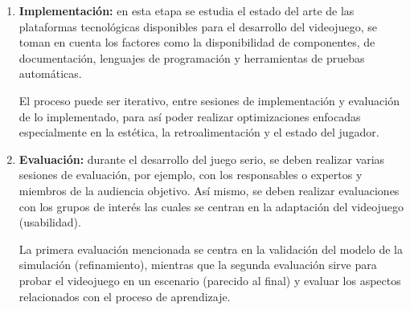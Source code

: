 \begin{enumerate}
\item \textbf{Implementación:} en esta etapa se estudia el estado del arte de las
    plataformas tecnológicas disponibles para el desarrollo del videojuego, se toman
    en cuenta los factores como la disponibilidad de componentes, de
    documentación, lenguajes de programación y herramientas de pruebas
    automáticas.

El proceso puede ser iterativo, entre sesiones de implementación y evaluación de
lo implementado, para así poder realizar optimizaciones enfocadas especialmente
en la estética, la retroalimentación y el estado del jugador.

\item \textbf{Evaluación:} durante el desarrollo del juego serio, se deben
    realizar varias sesiones de evaluación, por ejemplo, con los responsables o
    expertos y miembros de la audiencia objetivo. Así mismo, se deben realizar
    evaluaciones con los grupos de interés las cuales se centran en la
    adaptación del videojuego (usabilidad). 

La primera evaluación mencionada se centra en la validación del modelo de la
simulación (refinamiento), mientras que la segunda evaluación sirve para probar
el videojuego en un escenario (parecido al final) y evaluar los aspectos
relacionados con el proceso de aprendizaje.  

\end{enumerate}

